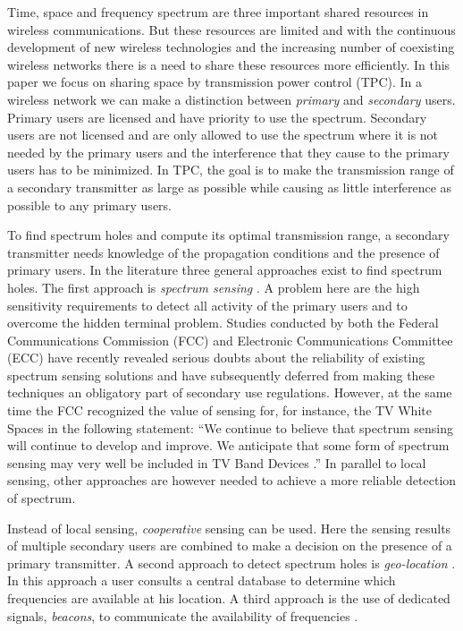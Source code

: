 Time, space and frequency spectrum are three important shared resources in wireless communications. But these resources are limited and with the continuous development of new wireless technologies and the increasing number of coexisting wireless networks there is a need to share these resources more efficiently. 
In this paper we focus on sharing space by transmission power control (TPC). In a wireless network we can make a distinction between \textit{primary} and \textit{secondary} users. Primary users are licensed and have priority to use the spectrum. Secondary users are not licensed and are only allowed to use the spectrum where it is not needed by the primary users and the interference that they cause to the primary users has to be minimized. In TPC, the goal is to make the transmission range of a secondary transmitter as large as possible while causing as little interference as possible to any primary users.

To find spectrum holes and compute its optimal transmission range, a secondary transmitter needs knowledge of the propagation conditions and the presence of primary users. In the literature three general approaches exist to find spectrum holes. The first approach is \textit{spectrum sensing} \cite{sensing1,sensing2}. A problem here are the high sensitivity requirements to detect all activity of the primary users and to overcome the hidden terminal problem. Studies conducted by both the Federal Communications Commission (FCC) and Electronic Communications Committee (ECC) have recently revealed serious doubts about the reliability of existing spectrum sensing solutions and have subsequently deferred from making these techniques an obligatory part of secondary use regulations. However, at the same time the FCC recognized the value of sensing for, for instance, the TV White Spaces in the following statement: ``We continue to believe that spectrum sensing will continue to develop and improve. We anticipate that some form of spectrum sensing may very well be included in TV Band Devices \cite{fcc}.''  In parallel to local sensing, other approaches are however needed to achieve a more reliable detection of spectrum. 

Instead of local sensing, \textit{cooperative} sensing can be used. Here the sensing results of multiple secondary users are combined to make a decision on the presence of a primary transmitter. A second approach to detect spectrum holes is \textit{geo-location} \cite{geoLocDyspan}. In this approach a user consults a central database to determine which frequencies are available at his location. A third approach is the use of dedicated signals, \textit{beacons}, to communicate the availability of frequencies \cite{beacon}.

